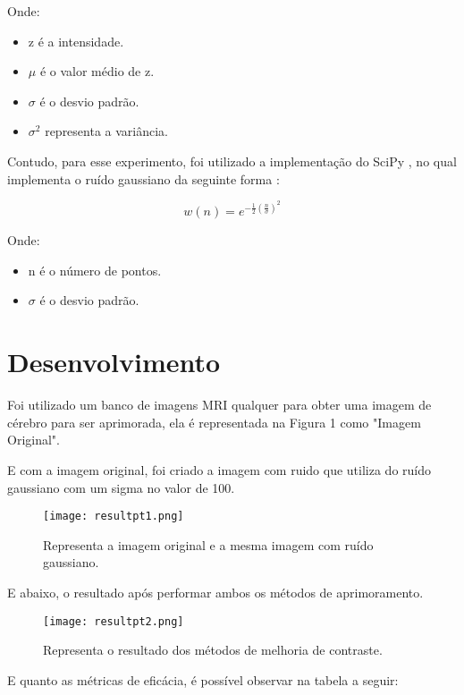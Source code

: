 \documentclass[conference]{IEEEtran}
\begin{document}
Onde:

\begin{itemize}
\item z é a intensidade.
\item \({\mu}\) é o valor médio de z.
\item \({\sigma}\) é o desvio padrão.
\item \({\sigma^2}\)  representa a variância.
\end{itemize}

Contudo, para esse experimento, foi utilizado a implementação do SciPy \cite{b4}, no qual implementa o ruído gaussiano da seguinte forma \cite{b14}:

\begin{equation}
w(n) = e^{ -\frac{1}{2}\left(\frac{n}{\sigma}\right)^2 }
\end{equation}

Onde:

\begin{itemize}
\item n é o número de pontos.
\item \({\sigma}\) é o desvio padrão.
\end{itemize}

\section{Desenvolvimento}

Foi utilizado um banco de imagens MRI qualquer para obter uma imagem de cérebro para ser aprimorada, ela é representada na Figura 1 como "Imagem Original".

E com a imagem original, foi criado a imagem com ruido que utiliza do ruído gaussiano com um sigma no valor de 100. 

\begin{figure}[H]
    \centering
    \texttt{[image: resultpt1.png]}
    \caption{Representa a imagem original e a mesma imagem com ruído gaussiano.}
    \label{fig:label1}
\end{figure}

E abaixo, o resultado após performar ambos os métodos de aprimoramento.

\begin{figure}[H]
    \centering
    \texttt{[image: resultpt2.png]}
    \caption{Representa o resultado dos métodos de melhoria de contraste.}
    \label{fig:label2}
\end{figure}

E quanto as métricas de eficácia, é possível observar na tabela a seguir:
\end{document}
